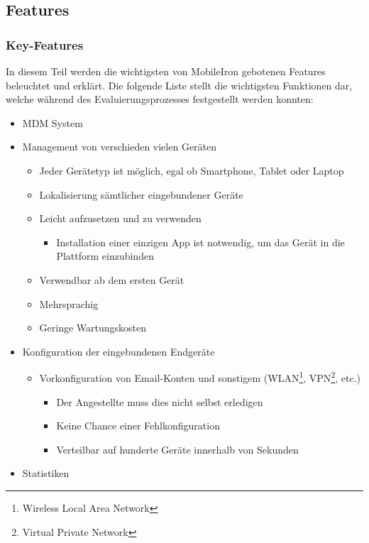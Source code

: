 \newpage

\subsection{Features}
\subsubsection{Key-Features}
In diesem Teil werden die wichtigsten von MobileIron gebotenen Features beleuchtet und erklärt. Die folgende Liste stellt die wichtigsten Funktionen dar, welche während des Evaluierungsprozesses festgestellt werden konnten:
\begin{itemize}
	\item MDM System
	\item Management von verschieden vielen Geräten
	\begin{itemize}
		\item Jeder Gerätetyp ist möglich, egal ob Smartphone, Tablet oder Laptop
		\item Lokalisierung sämtlicher eingebundener Geräte
		\item Leicht aufzusetzen und zu verwenden
		\begin{itemize}
			\item Installation einer einzigen App ist notwendig, um das Gerät in die Plattform einzubinden
		\end{itemize}
		\item Verwendbar ab dem ersten Gerät
		\item Mehrsprachig
		\item Geringe Wartungskosten
	\end{itemize}
	\item Konfiguration der eingebundenen Endgeräte
	\begin{itemize}
		\item Vorkonfiguration von Email-Konten und sonstigem (WLAN\footnote{Wireless Local Area Network}, VPN\footnote{Virtual Private Network}, etc.)
		\begin{itemize}
			\item Der Angestellte muss dies nicht selbst erledigen
			\item Keine Chance einer Fehlkonfiguration
			\item Verteilbar auf hunderte Geräte innerhalb von Sekunden
		\end{itemize}
	\end{itemize}
	\item Statistiken
	\begin{itemize}

\end{itemize}
\end{itemize}

